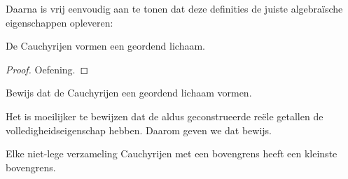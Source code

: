 \documentclass[openany]{memoir}
\begin{document}
Daarna is vrij eenvoudig aan te tonen dat deze definities de juiste
algebraïsche eigenschappen opleveren:
\begin{thm}
De Cauchyrijen vormen een geordend lichaam.
\end{thm}
\begin{proof}
Oefening.
\end{proof}
\begin{prob}
Bewijs dat de Cauchyrijen een geordend lichaam vormen.
\end{prob}
Het is moeilijker te bewijzen dat de aldus geconstrueerde reële
getallen de volledigheidseigenschap hebben. Daarom geven we dat bewijs.
\begin{thm}
Elke niet-lege verzameling Cauchyrijen met een bovengrens heeft een
kleinste bovengrens.
\end{thm}
\end{document}

